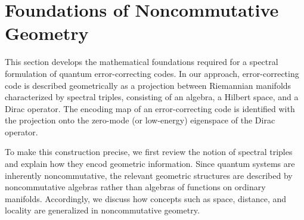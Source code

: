 \documentclass[12pt]{article}
\theoremstyle{definition} %
\theoremstyle{plain} %
\theoremstyle{remark} %
\theoremstyle{underline}
\begin{document}




\section{Foundations of Noncommutative Geometry}

This section develops the mathematical foundations required for a spectral formulation of quantum error-correcting codes.
In our approach, error-correcting code is described geometrically as a projection between Riemannian manifolds characterized by spectral triples, consisting of an algebra, a Hilbert space, and a Dirac operator.
The encoding map of an error-correcting code is identified with the projection onto the zero-mode (or low-energy) eigenspace of the Dirac operator.

To make this construction precise, we first review the notion of spectral triples and explain how they encod geometric information.
Since quantum systems are inherently noncommutative, the relevant geometric structures are described by noncommutative algebras rather than algebras of functions on ordinary manifolds.
Accordingly, we discuss how concepts such as space, distance, and locality are generalized in noncommutative geometry.
\end{document}
